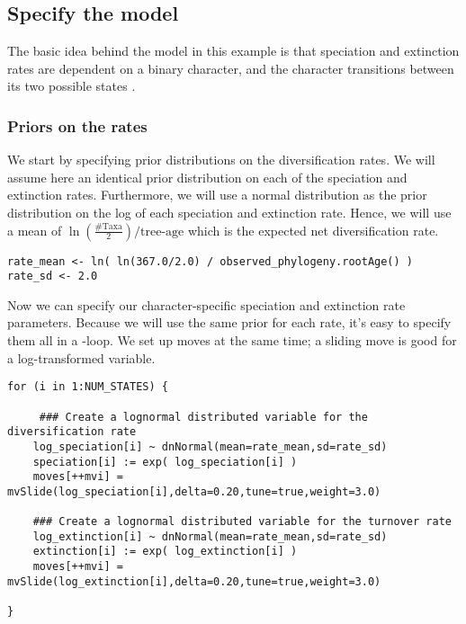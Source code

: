 \subsection{Specify the model}

The basic idea behind the model in this example is that speciation and extinction rates are dependent on a binary character, and the character transitions between its two possible states \citep{Maddison2007}.

\subsubsection{Priors on the rates}

We start by specifying prior distributions on the diversification rates.
We will assume here an identical prior distribution on each of the speciation and extinction rates.
Furthermore, we will use a normal distribution as the prior distribution on the log of each speciation and extinction rate.
Hence, we will use a mean of $\ln(\frac{\text{\#Taxa}}{2}) / \text{tree-age}$ which is the expected net diversification rate.
{\tt \begin{snugshade*}
\begin{lstlisting}
rate_mean <- ln( ln(367.0/2.0) / observed_phylogeny.rootAge() )
rate_sd <- 2.0
\end{lstlisting}
\end{snugshade*}}
Now we can specify our character-specific speciation and extinction rate parameters.
Because we will use the same prior for each rate, it's easy to specify them all in a -loop.
We set up moves at the same time; a sliding move is good for a log-transformed variable.
{\tt \begin{snugshade*}
\begin{lstlisting}
for (i in 1:NUM_STATES) {
    
     ### Create a lognormal distributed variable for the diversification rate
    log_speciation[i] ~ dnNormal(mean=rate_mean,sd=rate_sd) 
    speciation[i] := exp( log_speciation[i] )
    moves[++mvi] = mvSlide(log_speciation[i],delta=0.20,tune=true,weight=3.0)

    ### Create a lognormal distributed variable for the turnover rate
    log_extinction[i] ~ dnNormal(mean=rate_mean,sd=rate_sd) 
    extinction[i] := exp( log_extinction[i] )
    moves[++mvi] = mvSlide(log_extinction[i],delta=0.20,tune=true,weight=3.0)

}
\end{lstlisting}
\end{snugshade*}}

